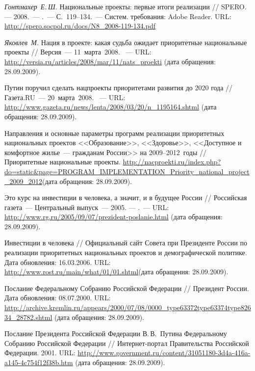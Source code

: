 \begin{thebibliography}{99}
 \emph{Гонтмахер~Е.\,Ш.} Национальные проекты: первые
  итоги реализации // SPERO. — 2008.~--- .~--- С.~119--134.~---
  Систем. требования: Adobe Reader. URL:
  \url{http://spero.socpol.ru/docs/N8_2008-119-134.pdf}

 \emph{Яковлев~М.} Нация в проекте: какая судьба
  ожидает приоритетные национальные проекты // Версия~---
  11~марта~2008. ~--- URL:
  \url{http://versia.ru/articles/2008/mar/11/nats_proekti} (дата
  обращения: 28.09.2009).

 Путин поручил сделать нацпроекты приоритетами
  развития до 2020 года // Газета.RU~--- 20~марта~2008. ~--- URL:
  \url{http://www.gazeta.ru/news/lenta/2008/03/20/n_1195164.shtml}
  (дата обращения: 28.09.2009).

 Направления и основные параметры программ реализации
  приоритетных национальных проектов <<Образование>>, <<Здоровье>>,
  <<Доступное и комфортное жилье~--- гражданам России>> на
  2009--2012~годы // Приоритетные национальные
  проекты. \url{http://nacproekti.ru/index.php?do=static&page=PROGRAM_IMPLEMENTATION_Priority_national_project_2009_2012}(дата
  обращения: 28.09.2009).

 Это курс на инвестиции в человека, а значит, и в
  будущее России // Российская газета~--- Центральный выпуск~---
  2005. — .~--- URL:
  \url{http://www.rg.ru/2005/09/07/prezident-poslanie.html} (дата
  обращения: 28.09.2009).

 Инвестиции в человека //
  Официальный сайт Совета при Президенте России по реализации
  приоритетных национальных проектов и демографической политике. Дата
  обновления: 16.03.2006. URL:
  \url{http://www.rost.ru/main/what/01/01.shtml}(дата обращения:
  28.09.2009).

 Послание Федеральному Собранию Российской
  Федерации // Президент России. Дата обновления:
  08.07.2000.  URL:
  \url{http://archive.kremlin.ru/appears/2000/07/08/0000_type63372type63374type82634_28782.shtml}
  (дата обращения: 28.09.2009).

Послание Президента Российской Федерации
  В.\,В.~Путина Федеральному Собранию Российской Федерации
  // Интернет-портал Правительства Российской
  Федерации. 2001.  URL:
  \url{http://www.government.ru/content/31051180-3d4a-416a-a145-4c754f12f38b.htm}
  (дата обращения: 28.09.2009).


\end{thebibliography}
